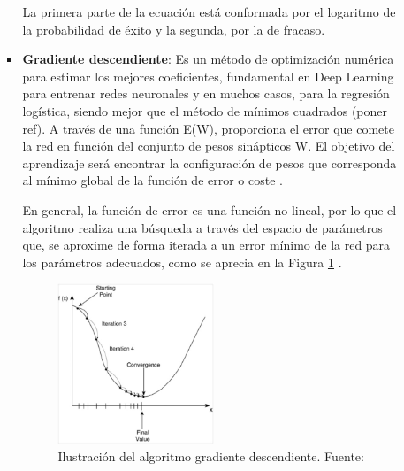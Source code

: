 \begin{itemize}
\begin{itemize}
\begin{itemize}
			La primera parte de la ecuación está conformada por el logaritmo de la probabilidad de éxito y la segunda, por la de fracaso.
			
			\item \textbf{Gradiente descendiente}: Es un método de optimización numérica para estimar los mejores coeficientes, fundamental en Deep Learning para entrenar redes neuronales y en muchos casos, para la regresión logística, siendo mejor que el método de mínimos cuadrados (poner ref). A través de una función E(W), proporciona el error que comete la red en función del conjunto de pesos sinápticos W. El objetivo del aprendizaje será encontrar la configuración de pesos que corresponda al mínimo global de la función de error o coste \parencite{tec_bertona2005algevol}.
			
			En general, la función de error es una función no lineal, por lo que el algoritmo realiza una búsqueda a través del espacio de parámetros que, se aproxime de forma iterada a un error mínimo de la red para los parámetros adecuados, como se aprecia en la Figura \ref{2:fig14} \parencite{tec_sancho2017descentgrad}.
			\begin{figure}[h]
				\begin{center}
					\includegraphics[width=0.5\textwidth]{2/figures/gradiente_descendiente.jpg}
					\caption{Ilustración del algoritmo gradiente descendiente. Fuente: \cite{tec_sancho2017descentgrad}}
					\label{2:fig14}
				\end{center}
			\end{figure}
			

\end{itemize}
\end{itemize}
\end{itemize}
